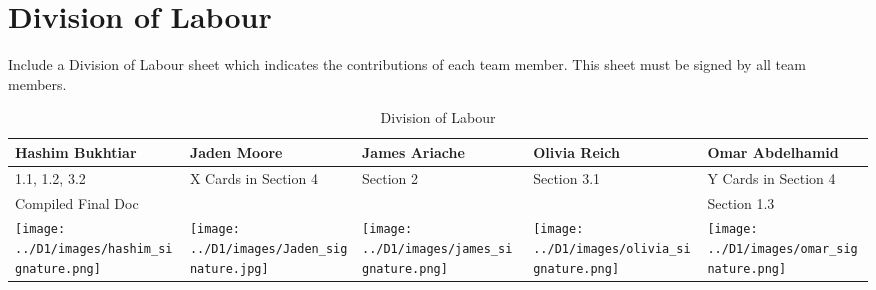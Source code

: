 \documentclass[]{article}
\begin{document}
\appendix
\section{Division of Labour}
\label{sec:division_of_labour}
Include a Division of Labour sheet which indicates the contributions of each team member. This sheet must be signed by all team members.
\begin{table}[h!]
\centering
\begin{tabular}{|p{3cm}|p{3.5cm}|p{3cm}|p{3cm}|p{3.5cm}|}
\hline
Hashim Bukhtiar & Jaden Moore & James Ariache & Olivia Reich & Omar Abdelhamid \\ \hline
1.1, 1.2, 3.2 & X Cards in Section 4 & Section 2 & Section 3.1 & Y Cards in Section 4 \\ 
Compiled Final Doc &  &  &  & Section 1.3 \\
\texttt{[image: ../D1/images/hashim\_signature.png]} & \texttt{[image: ../D1/images/Jaden\_signature.jpg]} &
\texttt{[image: ../D1/images/james\_signature.png]}& \texttt{[image: ../D1/images/olivia\_signature.png]} & \texttt{[image: ../D1/images/omar\_signature.png]}  \\
\hline
\end{tabular}
\caption{Division of Labour} 
\label{tab:division_of_labour}
\end{table}
\end{document}
